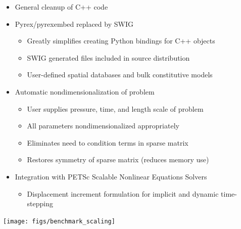\documentclass[pdftex,cig,slideColor]{pp4slides}
\begin{document}
  \summary{}

  \begin{itemize}
  \item General cleanup of C++ code
  \item Pyrex/pyrexembed replaced by SWIG
    \begin{itemize}
    \item Greatly simplifies creating Python bindings for C++ objects
    \item SWIG generated files included in source distribution
    \item User-defined spatial databases and bulk constitutive models
    \end{itemize}
  \item Automatic nondimensionalization of problem
    \begin{itemize}
    \item User supplies pressure, time, and length scale of problem
    \item All parameters nondimensionalized appropriately
    \item Eliminates need to condition terms in sparse matrix
    \item Restores symmetry of sparse matrix (reduces memory use)
    \end{itemize}
  \item Integration with PETSc Scalable Nonlinear Equations Solvers
   \begin{itemize}
    \item Displacement increment formulation for implicit and dynamic 
      time-stepping
   \end{itemize}
  \end{itemize}
    


  \vfill
  \begin{center}
    \texttt{[image: figs/benchmark\_scaling]}
  \end{center}
  \vfill

\end{document}
